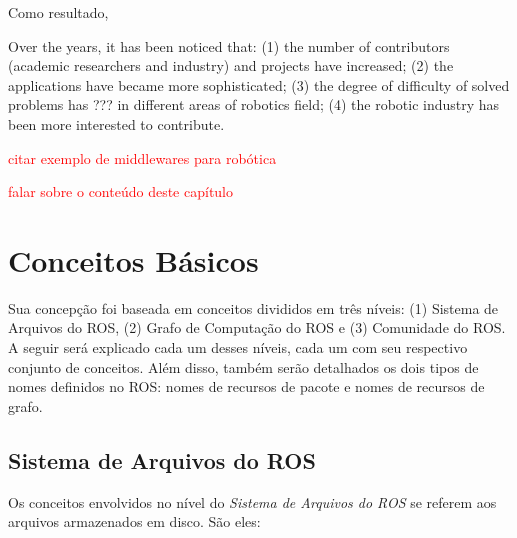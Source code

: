     Como resultado, 
    
    Over the years, it has been noticed that:
	(1) the number of contributors (academic researchers and industry) and projects have increased;
	(2) the applications have became more sophisticated;
	(3) the degree of difficulty of solved problems has ??? in different areas of robotics field;
	(4) the robotic industry has been more interested to contribute.
	
	\textcolor{red}{citar exemplo de middlewares para robótica}
    
    \textcolor{red}{falar sobre o conteúdo deste capítulo}
    
    \section{Conceitos Básicos} \label{sec:ros_conceitos}
    
        Sua concepção foi baseada em conceitos divididos em três níveis: (1) Sistema de Arquivos do ROS, (2) Grafo de Computação do ROS e (3) Comunidade do ROS. A seguir será explicado cada um desses níveis, cada um com seu respectivo conjunto de conceitos. Além disso, também serão detalhados os dois tipos de nomes definidos no ROS: nomes de recursos de pacote e nomes de recursos de grafo.
        
        \subsection{Sistema de Arquivos do ROS}
            
            Os conceitos envolvidos no nível do \textit{Sistema de Arquivos do ROS} se referem aos arquivos armazenados em disco. São eles:
            
